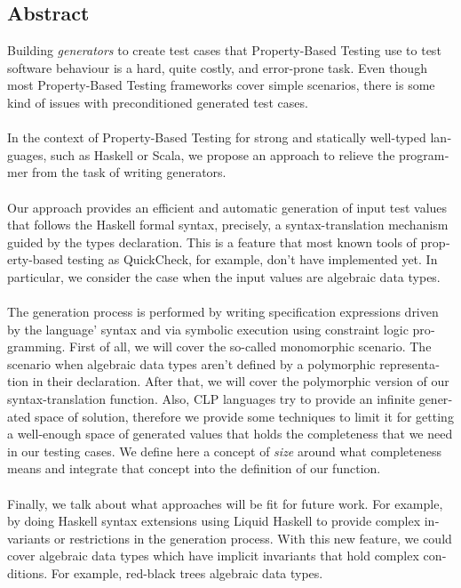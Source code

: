\begin{otherlanguage}{english}
	\chapter*{Abstract}
	Building \textit{generators} to create test cases that Property-Based Testing use to test software behaviour is a hard, quite costly, and error-prone task. Even though most Property-Based Testing frameworks cover simple scenarios, there is some kind of issues with preconditioned generated test cases.
	\\\\
	In the context of Property-Based Testing for strong and statically well-typed languages, such as Haskell or Scala, we propose an approach to relieve the programmer from the task of writing generators.\\\\
	Our approach provides an efficient and automatic generation of input test values that
	follows the Haskell formal syntax, precisely, a syntax-translation mechanism guided by the types declaration. This is a feature that most known tools of property-based testing as QuickCheck, for example, don't have implemented yet. In particular, we consider the case when the input values are algebraic data types.\\\\
	The generation process is performed by writing specification expressions driven by the language' syntax and via symbolic execution using constraint logic programming. First of all, we will cover the so-called monomorphic scenario. The scenario when algebraic data types aren't defined by a polymorphic representation in their declaration. After that, we will cover the polymorphic version of our syntax-translation function. Also, CLP languages try to provide an infinite generated space of solution, therefore we provide some techniques to limit it for getting a well-enough space of generated values that holds the completeness that we need in our testing cases. We define here a concept of \textit{size} around what completeness means and integrate that concept into the definition of our function.\\\\
	Finally, we talk about what approaches will be fit for future work. For example, by doing Haskell syntax extensions using Liquid Haskell to provide complex invariants or restrictions in the generation process. With this new feature, we could cover algebraic data types which have implicit invariants that hold complex conditions. For example, red-black trees algebraic data types.
	
\end{otherlanguage}


